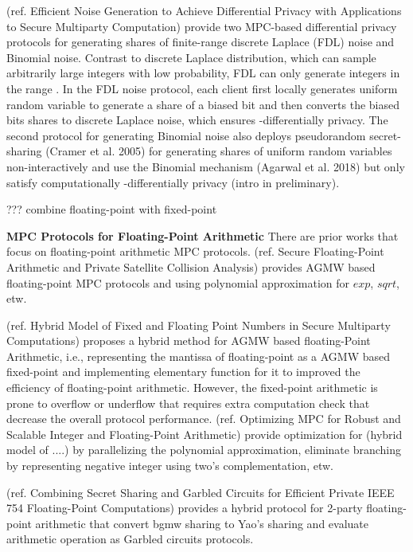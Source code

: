 (ref. Efficient Noise Generation to Achieve Differential Privacy with Applications to Secure Multiparty Computation) provide two MPC-based differential privacy protocols for generating shares of finite-range discrete Laplace (FDL) noise and Binomial noise. Contrast to discrete Laplace distribution, which can sample arbitrarily large integers with low probability, FDL can only generate integers in the range . In the FDL noise protocol, each client first locally generates uniform random variable to generate a share of a biased bit and then converts the biased bits shares to discrete Laplace noise, which ensures -differentially privacy. The second protocol for generating Binomial noise also deploys pseudorandom secret-sharing (Cramer et al. 2005) for generating shares of uniform random variables non-interactively and use the Binomial mechanism (Agarwal et al. 2018) but only satisfy computationally -differentially privacy (intro in preliminary).


??? combine floating-point with fixed-point

\textbf{MPC Protocols for Floating-Point Arithmetic}
There are prior works that focus on floating-point arithmetic MPC protocols.  
(ref. Secure Floating-Point Arithmetic and Private Satellite Collision Analysis) provides AGMW based floating-point MPC protocols and using polynomial approximation for $exp$, $sqrt$, etw. 

(ref. Hybrid Model of Fixed and Floating Point Numbers in Secure Multiparty Computations) proposes a hybrid method for AGMW based floating-Point Arithmetic, i.e., representing the mantissa of floating-point as a AGMW based fixed-point and implementing elementary function for it to improved the efficiency of floating-point arithmetic. However, the fixed-point arithmetic is prone to overflow or underflow that requires extra computation check that decrease the overall protocol performance. (ref. Optimizing MPC for Robust and Scalable Integer and Floating-Point Arithmetic) provide optimization for (hybrid model of ....) by parallelizing the polynomial approximation, eliminate branching by representing negative integer using two's complementation, etw. 

(ref. Combining Secret Sharing and Garbled Circuits for Efficient Private IEEE 754 Floating-Point Computations) provides a hybrid protocol for 2-party floating-point arithmetic that convert bgmw sharing to Yao's sharing and evaluate arithmetic operation as Garbled circuits protocols. 



